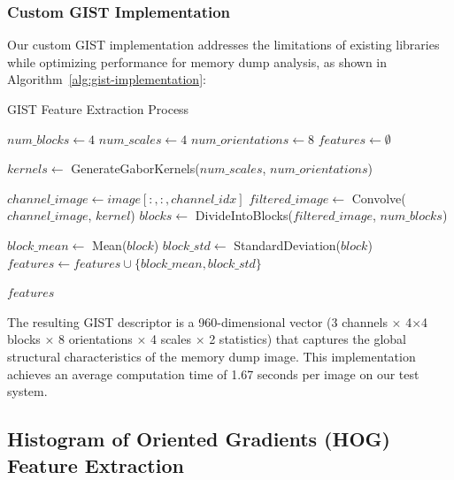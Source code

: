 \subsubsection{Custom GIST Implementation}

Our custom GIST implementation addresses the limitations of existing libraries while optimizing performance for memory dump analysis, as shown in Algorithm~\ref{alg:gist-implementation}:

\begin{algorithm}[!htbp]
\caption{GIST Feature Extraction Process}
\label{alg:gist-implementation}
\begin{algorithmic}[1]
    \State $num\_blocks \leftarrow 4$ 
    \State $num\_scales \leftarrow 4$ 
    \State $num\_orientations \leftarrow 8$ 
    \State $features \leftarrow \emptyset$ 
    
    \State $kernels \leftarrow$ GenerateGaborKernels($num\_scales$, $num\_orientations$)
    
     
        \State $channel\_image \leftarrow image[:, :, channel\_idx]$
            \State $filtered\_image \leftarrow$ Convolve($channel\_image$, $kernel$)
            \State $blocks \leftarrow$ DivideIntoBlocks($filtered\_image$, $num\_blocks$)
            
                \State $block\_mean \leftarrow$ Mean($block$)
                \State $block\_std \leftarrow$ StandardDeviation($block$)
                \State $features \leftarrow features \cup \{block\_mean, block\_std\}$
            \EndFor
        \EndFor
    \EndFor
    
    \Return $features$ 
\EndProcedure
\end{algorithmic}
\end{algorithm}

The resulting GIST descriptor is a 960-dimensional vector (3 channels × 4×4 blocks × 8 orientations × 4 scales × 2 statistics) that captures the global structural characteristics of the memory dump image. This implementation achieves an average computation time of 1.67 seconds per image on our test system.

\subsection{Histogram of Oriented Gradients (HOG) Feature Extraction}
\label{subsec:hog-extraction}

